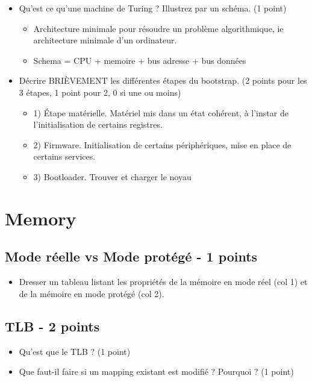 \begin{correction}
\begin{itemize}
  \item Qu'est ce qu'une machine de Turing ? Illustrez par un sch\'ema. (1 point)
  \begin{itemize}
        \item Architecture minimale pour r\'esoudre un probl\`eme algorithmique, ie architecture minimale d'un ordinateur.
        \item Schema = CPU + memoire + bus adresse + bus donn\'ees
  \end{itemize}

  \item D\'ecrire BRI\`EVEMENT les diff\'erentes \'etapes du bootstrap. (2 points pour les 3 \'etapes, 1 point pour 2, 0 si une ou moins)
  \begin{itemize}
     \item 1) \'Etape mat\'erielle.  Mat\'eriel mis dans un \'etat coh\'erent, à l'instar de l'initialisation de certains registres.
     \item 2) Firmware. Initialisation de certains p\'eriph\'eriques, mise en place de certains services.
     \item 3) Bootloader. Trouver et charger le noyau
  \end{itemize}
\end{itemize}

\end{correction}

%
%

\section{Memory
         {\hfill{} }}


\subsection{Mode r\'eelle vs Mode prot\'eg\'e - 1 points}
\begin{itemize}
   \item Dresser un tableau listant les propri\'et\'es de la m\'emoire en mode r\'eel (col 1) et de la m\'emoire en mode prot\'eg\'e (col 2).
\end{itemize}

\subsection{TLB - 2 points}
\begin{itemize}
   \item Qu'est que le TLB ? (1 point)
   \item Que faut-il faire si un mapping existant est modifi\'e ? Pourquoi ? (1 point)
\end{itemize}


